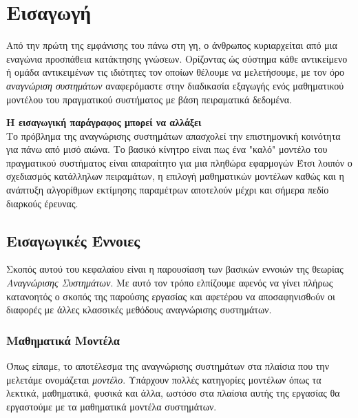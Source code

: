 \chapter{Εισαγωγή}

Από την πρώτη της εμφάνισης του πάνω στη γη, ο άνθρωπος κυριαρχείται από μια εναγώνια προσπάθεια κατάκτησης γνώσεων. Ορίζοντας ώς σύστημα κάθε αντικείμενο ή ομάδα αντικειμένων τις ιδιότητες τον οποίων θέλουμε να μελετήσουμε, με τον όρο \textit{αναγνώριση συστημάτων} αναφερόμαστε στην διαδικασία εξαγωγής ενός μαθηματικού μοντέλου του πραγματικού συστήματος με βάση πειραματικά δεδομένα. 

\textbf{Η εισαγωγική παράγραφος μπορεί να αλλάξει} \\
Το πρόβλημα της αναγνώρισης συστημάτων απασχολεί την επιστημονική κοινότητα για πάνω από μισό αιώνα. Το βασικό κίνητρο είναι πως ένα "καλό" μοντέλο του πραγματικού συστήματος είναι απαραίτητο για μια πληθώρα εφαρμογών %
Έτσι λοιπόν ο σχεδιασμός κατάλληλων πειραμάτων, η επιλογή μαθηματικών μοντέλων καθώς και η ανάπτυξη αλγορίθμων εκτίμησης παραμέτρων αποτελούν  μέχρι και σήμερα πεδίο διαρκούς έρευνας.

\section{Εισαγωγικές Έννοιες}
Σκοπός αυτού του κεφαλαίου είναι η παρουσίαση των βασικών εννοιών της θεωρίας \textit{Αναγνώρισης Συστημάτων}. Με αυτό τον τρόπο ελπίζουμε αφενός να γίνει πλήρως κατανοητός ο σκοπός της παρούσης εργασίας και αφετέρου να αποσαφηνισθoύν οι διαφορές με άλλες κλασσικές μεθόδους αναγνώρισης συστημάτων.

\subsection{Μαθηματικά Μοντέλα}
Όπως είπαμε, το αποτέλεσμα της αναγνώρισης συστημάτων στα πλαίσια που την μελετάμε ονομάζεται \textit{μοντέλο}. Υπάρχουν πολλές κατηγορίες μοντέλων όπως τα λεκτικά, μαθηματικά, φυσικά και άλλα, ωστόσο στα πλαίσια αυτής της εργασίας θα εργαστούμε με τα μαθηματικά μοντέλα συστημάτων.


